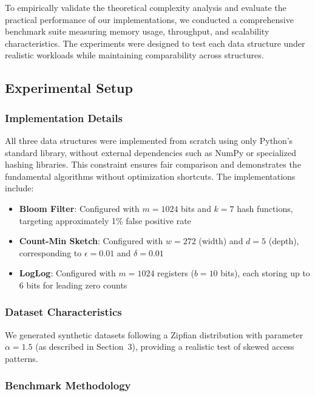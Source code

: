 To empirically validate the theoretical complexity analysis and evaluate the practical performance of our implementations, we conducted a comprehensive benchmark suite measuring memory usage, throughput, and scalability characteristics. The experiments were designed to test each data structure under realistic workloads while maintaining comparability across structures.

\subsection{Experimental Setup}

\subsubsection{Implementation Details}

All three data structures were implemented from scratch using only Python's standard library, without external dependencies such as NumPy or specialized hashing libraries. This constraint ensures fair comparison and demonstrates the fundamental algorithms without optimization shortcuts. The implementations include:

\begin{itemize}
    \item \textbf{Bloom Filter}: Configured with $m = 1024$ bits and $k = 7$ hash functions, targeting approximately 1\% false positive rate
    \item \textbf{Count-Min Sketch}: Configured with $w = 272$ (width) and $d = 5$ (depth), corresponding to $\epsilon = 0.01$ and $\delta = 0.01$
    \item \textbf{LogLog}: Configured with $m = 1024$ registers ($b = 10$ bits), each storing up to 6 bits for leading zero counts
\end{itemize}

\subsubsection{Dataset Characteristics}

We generated synthetic datasets following a Zipfian distribution with parameter $\alpha = 1.5$ (as described in Section~3), providing a realistic test of skewed access patterns.

\subsubsection{Benchmark Methodology}

